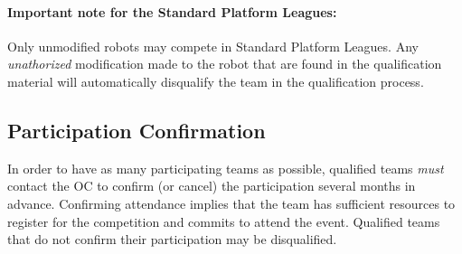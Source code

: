 \paragraph{Important note for the Standard Platform Leagues:} Only unmodified robots may compete in Standard Platform Leagues. Any \textit{unathorized} modification made to the robot that are found in the qualification material will automatically disqualify the team in the qualification process. %

\subsection{Participation Confirmation}
\label{rule:participation-confirmation}

In order to have as many participating teams as possible, qualified teams \emph{must} contact the OC to confirm (or cancel) the participation several months in advance.
Confirming attendance implies that the team has sufficient resources to register for the competition and commits to attend the event.
Qualified teams that do not confirm their participation may be disqualified.


